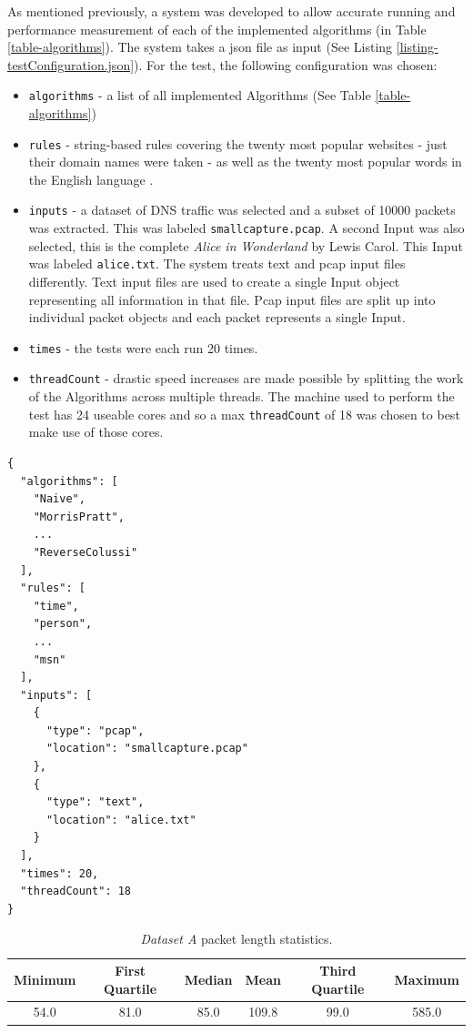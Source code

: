 \documentclass[11pt]{article}
\begin{document}
As mentioned previously, a system was developed to allow accurate running and performance measurement of each of the implemented algorithms (in Table \ref{table-algorithms}). The system takes a json file as input (See Listing \ref{listing-testConfiguration.json}). For the test, the following configuration was chosen:
\begin{itemize}
  \item \texttt{algorithms} - a list of all implemented Algorithms (See Table \ref{table-algorithms}) 
  \item \texttt{rules} - string-based rules covering the twenty most popular websites \citep{alexa2016} - just their domain names were taken - as well as the twenty most popular words in the English language \citep{oed2016}.
  \item \texttt{inputs} - a dataset of DNS traffic was selected and a subset of 10000 packets was extracted. This was labeled \texttt{smallcapture.pcap}. A second Input was also selected, this is the complete \textit{Alice in Wonderland} by Lewis Carol. This Input was labeled \texttt{alice.txt}. The system treats text and pcap input files differently. Text input files are used to create a single Input object representing all information in that file. Pcap input files are split up into individual packet objects and each packet represents a single Input.
  \item \texttt{times} - the tests were each run 20 times.
  \item \texttt{threadCount} - drastic speed increases are made possible by splitting the work of the Algorithms across multiple threads. The machine used to perform the test has 24 useable cores and so a max \texttt{threadCount} of 18 was chosen to best make use of those cores.
\end{itemize}


\begin{lstlisting}[caption = {Sample testConfiguration.json}, label = {listing-testConfiguration.json}]
{
  "algorithms": [
    "Naive",
    "MorrisPratt",
    ...
    "ReverseColussi"
  ],
  "rules": [
    "time",
    "person",
    ...
    "msn"
  ],
  "inputs": [
    {
      "type": "pcap",
      "location": "smallcapture.pcap"
    },
    {
      "type": "text",
      "location": "alice.txt"
    }
  ],
  "times": 20,
  "threadCount": 18
}
\end{lstlisting}

\begin{table}[hbt]
  \centering
  \begin{tabular}{cccccc}
    Minimum & First Quartile & Median & Mean & Third Quartile & Maximum \\
    \hline
    54.0 & 81.0 & 85.0 & 109.8 & 99.0 & 585.0
  \end{tabular}
  \caption{\textit{Dataset A} packet length statistics.}
  \label{table-inputsummary}
\end{table}
\end{document}
